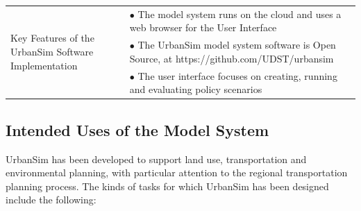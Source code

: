 \begin{table}[htp]
\begin{center}
\begin{tabular}{ p{1.5in}  p{4.4in}  }
\midrule
\multirow{8}{1,5in}{Key Features of the UrbanSim Software Implementation}
&  $\bullet$   The model system runs on the cloud and uses a web browser for the User Interface\\
& $\bullet$  The UrbanSim model system software is Open Source, at https://github.com/UDST/urbansim\\
&  $\bullet$   The user interface focuses on creating, running and evaluating policy scenarios\\
\bottomrule
\end{tabular}
\end{center}
\end{table}

\subsection{Intended Uses of the Model System}

UrbanSim has been developed to support land use, transportation and
environmental planning, with particular attention to the regional
transportation planning process. The kinds of tasks for which UrbanSim
has been designed include the following:

